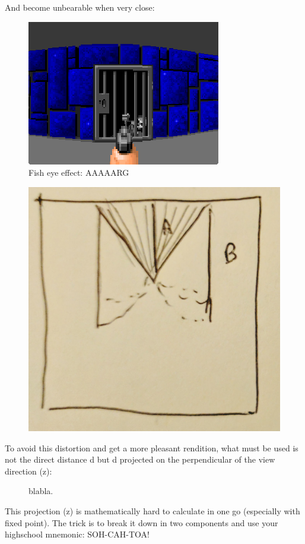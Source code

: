 And become unbearable when very close:
 \begin{figure}[H]
\centering
 \includegraphics[width=\textwidth]{screenshots/fish_eye/bad_bad.png}
 \caption{Fish eye effect: AAAAARG} \label{fig:mips}
 \end{figure}
 \begin{figure}[H]
  \centering
 \includegraphics[width=.3\textwidth]{imgs/drawings/fish_eye/fish_eye_top_close.png}
\end{figure}
\par
 
To avoid this distortion and get a more pleasant rendition, what must be used is not the direct distance d but d projected on the perpendicular of the view direction (z):

\begin{figure}[H]
\centering
 
 \caption{blabla.} \label{fig:Raycasting2}
\end{figure}

This projection (z) is mathematically hard to calculate in one go (especially with fixed point). The trick is to break it down in two components and use your highschool mnemonic: SOH-CAH-TOA!\\


